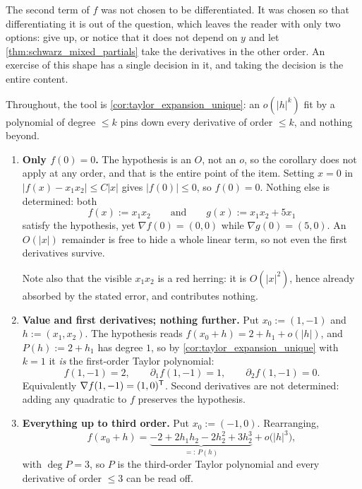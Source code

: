 \begin{remark}
The second term of $f$ was not chosen to be differentiated. It was chosen so that differentiating
it is out of the question, which leaves the reader with only two options: give up, or notice that
it does not depend on $y$ and let \cref{thm:schwarz_mixed_partials} take the derivatives in the
other order. An exercise of this shape has a single decision in it, and taking the decision is the
entire content.
\end{remark}

\begin{exercisesolution}
\label{sol:reading_off_expansions}
Throughout, the tool is \cref{cor:taylor_expansion_unique}: an $o(\lvert h\rvert^{k})$ fit by a
polynomial of degree $\leq k$ pins down every derivative of order $\leq k$, and nothing beyond.
\begin{enumerate}[label=\textbf{(\alph*)}]
  \item \textbf{Only $f(0)=0$.} The hypothesis is an $O$, not an $o$, so the corollary does not
    apply at any order, and that is the entire point of the item. Setting $x=0$ in
    $\lvert f(x)-x_1x_2\rvert \leq C\lvert x\rvert$ gives $\lvert f(0)\rvert \leq 0$, so
    $f(0)=0$. Nothing else is determined: both
    \[f(x) := x_1x_2 \qquad\text{and}\qquad g(x) := x_1x_2 + 5x_1\]
    satisfy the hypothesis, yet $\nabla f(0) = (0,0)$ while $\nabla g(0) = (5,0)$. An
    $O(\lvert x\rvert)$ remainder is free to hide a whole linear term, so not even the first
    derivatives survive.

    Note also that the visible $x_1x_2$ is a red herring: it is $O(\lvert x\rvert^2)$, hence
    already absorbed by the stated error, and contributes nothing.
  \item \textbf{Value and first derivatives; nothing further.} Put $x_0 := (1,-1)$ and
    $h := (x_1,x_2)$. The hypothesis reads $f(x_0+h) = 2 + h_1 + o(\lvert h\rvert)$, and
    $P(h) := 2 + h_1$ has degree $1$, so by \cref{cor:taylor_expansion_unique} with $k=1$ it
    \emph{is} the first-order Taylor polynomial:
    \[f(1,-1) = 2, \qquad \partial_1f(1,-1) = 1, \qquad \partial_2f(1,-1) = 0.\]
    Equivalently $\nabla f(1,-1) = (1,0)^{\mathsf{T}}$. Second derivatives are not determined: adding
    any quadratic to $f$ preserves the hypothesis.
  \item \textbf{Everything up to third order.} Put $x_0 := (-1,0)$. Rearranging,
    \[f(x_0+h) = \underbrace{-2 + 2h_1h_2 - 2h_2^2 + 3h_2^3}_{=:\,P(h)} + o\big(\lvert h\rvert^3\big),\]
    with $\deg P = 3$, so $P$ is the third-order Taylor polynomial and every derivative of order
    $\leq 3$ can be read off.


\end{enumerate}
\end{exercisesolution}
